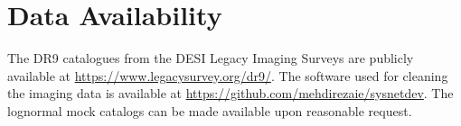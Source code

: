 \section*{Data Availability}
\label{sec:dataavail}
The DR9 catalogues from the DESI Legacy Imaging Surveys are publicly available at \href{https://www.legacysurvey.org/dr9/}{https://www.legacysurvey.org/dr9/}. The software used for cleaning the imaging data is available at \href{https://github.com/mehdirezaie/sysnetdev}{https://github.com/mehdirezaie/sysnetdev}. The lognormal mock catalogs can be made available upon reasonable request.